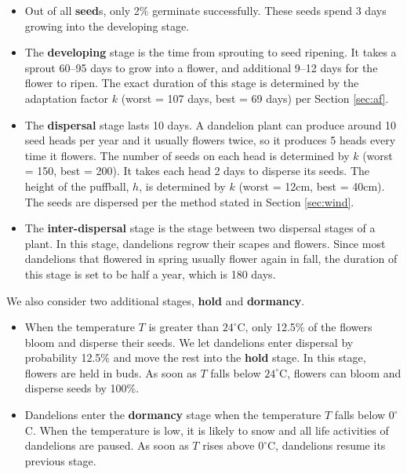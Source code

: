 \documentclass[12pt]{article}
\begin{document}
		\begin{itemize}
			
			\item Out of all \textbf{seed}s, only 2\% germinate successfully\autocite{honek2005post}.  These seeds spend 3 days growing into the developing stage\autocite{stewart2002biology}.
			
			\item The \textbf{developing} stage is the time from sprouting to seed ripening.  It takes a sprout 60--95 days to grow into a flower, and additional 9--12 days for the flower to ripen\autocite{gardenorganicNAripen}.  The exact duration of this stage is determined by the adaptation factor $k$ (worst = 107 days, best = 69 days) per Section \ref{sec:af}.
			
			\item The \textbf{dispersal} stage lasts 10 days.  A dandelion plant can produce around 10 seed heads per year and it usually flowers twice, so it produces 5 heads every time it flowers.  The number of seeds on each head is determined by $k$ (worst = 150, best = 200)\autocite{dukeNAdandelion}.  It takes each head 2 days to disperse its seeds.  The height of the puffball, $h$, is determined by $k$ (worst = 12cm, best = 40cm)\autocite{veggiegardenNAstem}.  The seeds are dispersed per the method stated in Section \ref{sec:wind}.
			
			\item The \textbf{inter-dispersal} stage is the stage between two dispersal stages of a plant.  In this stage, dandelions regrow their scapes and flowers.  Since most dandelions that flowered in spring usually flower again in fall\autocite{stewart2002biology}, the duration of this stage is set to be half a year, which is 180 days.   
			
		\end{itemize}
		We also consider two additional stages, \textbf{hold} and \textbf{dormancy}.		
		\begin{itemize}
			
			\item When the temperature $T$ is greater than $24^\circ$C, only 12.5\% of the flowers bloom and disperse their seeds\autocite{yoshie2020effects}.  We let dandelions enter dispersal by probability 12.5\% and move the rest into the \textbf{hold} stage.  In this stage, flowers are held in buds.  As soon as $T$ falls below $24^\circ$C, flowers can bloom and disperse seeds by 100\%.  
		
			\item Dandelions enter the \textbf{dormancy} stage when the temperature $T$ falls below $0^\circ$C.  When the temperature is low, it is likely to snow and all life activities of dandelions are paused.  As soon as $T$ rises above $0^\circ$C, dandelions resume its previous stage.
		
		\end{itemize}
		
\end{document}
